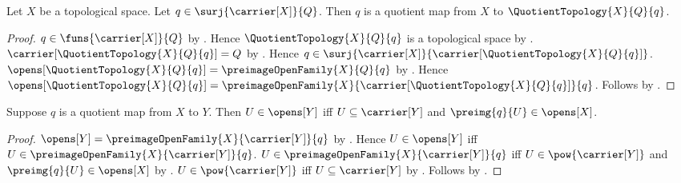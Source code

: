 \begin{theorem}\label{quotient_topology_structure_map_is_quotient_map}
    Let $X$ be a topological space.
    Let $q\in\surj{\carrier[X]}{Q}$.
    Then $q$ is a quotient map from $X$ to
        $\QuotientTopology{X}{Q}{q}$.
\end{theorem}
\begin{proof}
    $q\in\funs{\carrier[X]}{Q}$ by .
    Hence $\QuotientTopology{X}{Q}{q}$ is a topological space by
        .
    $\carrier[\QuotientTopology{X}{Q}{q}]=Q$ by
        .
    Hence $q\in\surj{\carrier[X]}{
        \carrier[\QuotientTopology{X}{Q}{q}]}$.
    $\opens[\QuotientTopology{X}{Q}{q}]
        =\preimageOpenFamily{X}{Q}{q}$ by
        .
    Hence $\opens[\QuotientTopology{X}{Q}{q}]
        =\preimageOpenFamily{X}{
            \carrier[\QuotientTopology{X}{Q}{q}]}{q}$.
    Follows by .
\end{proof}

\begin{proposition}\label{quotient_map_open_iff}
    Suppose $q$ is a quotient map from $X$ to $Y$.
    Then $U\in\opens[Y]$ iff
        $U\subseteq\carrier[Y]$ and
        $\preimg{q}{U}\in\opens[X]$.
\end{proposition}
\begin{proof}
    $\opens[Y]=\preimageOpenFamily{X}{\carrier[Y]}{q}$ by
        .
    Hence $U\in\opens[Y]$ iff
        $U\in\preimageOpenFamily{X}{\carrier[Y]}{q}$.
    $U\in\preimageOpenFamily{X}{\carrier[Y]}{q}$ iff
        $U\in\pow{\carrier[Y]}$ and
        $\preimg{q}{U}\in\opens[X]$ by
        .
    $U\in\pow{\carrier[Y]}$ iff
        $U\subseteq\carrier[Y]$ by .
    Follows by \auto.
\end{proof}

